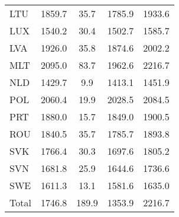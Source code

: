 \begin{table}[hb!]
\begin{threeparttable}
{\begin{tabular}{l*{1}{cccc}}
LTU                 &      1859.7&        35.7&      1785.9&      1933.6\\
LUX                 &      1540.2&        30.4&      1502.7&      1585.7\\
LVA                 &      1926.0&        35.8&      1874.6&      2002.2\\
MLT                 &      2095.0&        83.7&      1962.6&      2216.7\\
NLD                 &      1429.7&         9.9&      1413.1&      1451.9\\
POL                 &      2060.4&        19.9&      2028.5&      2084.5\\
PRT                 &      1880.0&        15.7&      1849.0&      1900.5\\
ROU                 &      1840.5&        35.7&      1785.7&      1893.8\\
SVK                 &      1766.4&        30.3&      1697.6&      1805.2\\
SVN                 &      1681.8&        25.9&      1644.6&      1736.6\\
SWE                 &      1611.3&        13.1&      1581.6&      1635.0\\
Total               &      1746.8&       189.9&      1353.9&      2216.7\\
\bottomrule
\end{tabular}}
\end{threeparttable}
\end{table}